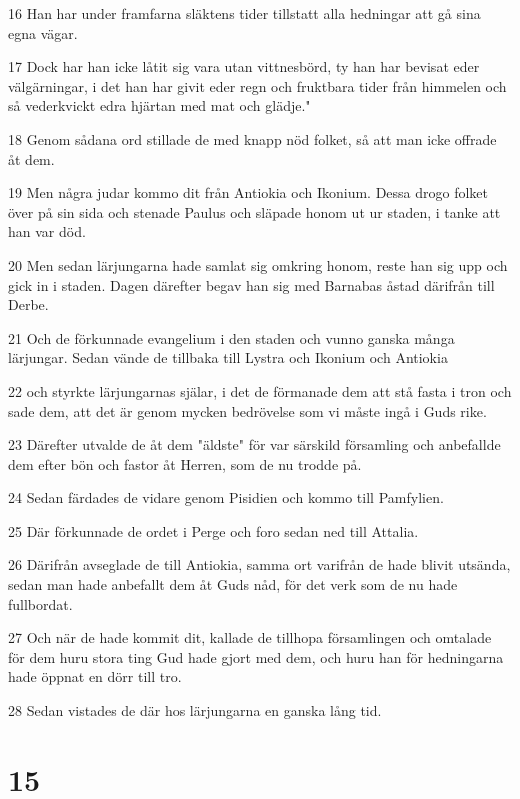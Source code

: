 \par 16 Han har under framfarna släktens tider tillstatt alla hedningar att gå sina egna vägar.
\par 17 Dock har han icke låtit sig vara utan vittnesbörd, ty han har bevisat eder välgärningar, i det han har givit eder regn och fruktbara tider från himmelen och så vederkvickt edra hjärtan med mat och glädje."
\par 18 Genom sådana ord stillade de med knapp nöd folket, så att man icke offrade åt dem.
\par 19 Men några judar kommo dit från Antiokia och Ikonium. Dessa drogo folket över på sin sida och stenade Paulus och släpade honom ut ur staden, i tanke att han var död.
\par 20 Men sedan lärjungarna hade samlat sig omkring honom, reste han sig upp och gick in i staden. Dagen därefter begav han sig med Barnabas åstad därifrån till Derbe.
\par 21 Och de förkunnade evangelium i den staden och vunno ganska många lärjungar. Sedan vände de tillbaka till Lystra och Ikonium och Antiokia
\par 22 och styrkte lärjungarnas själar, i det de förmanade dem att stå fasta i tron och sade dem, att det är genom mycken bedrövelse som vi måste ingå i Guds rike.
\par 23 Därefter utvalde de åt dem "äldste" för var särskild församling och anbefallde dem efter bön och fastor åt Herren, som de nu trodde på.
\par 24 Sedan färdades de vidare genom Pisidien och kommo till Pamfylien.
\par 25 Där förkunnade de ordet i Perge och foro sedan ned till Attalia.
\par 26 Därifrån avseglade de till Antiokia, samma ort varifrån de hade blivit utsända, sedan man hade anbefallt dem åt Guds nåd, för det verk som de nu hade fullbordat.
\par 27 Och när de hade kommit dit, kallade de tillhopa församlingen och omtalade för dem huru stora ting Gud hade gjort med dem, och huru han för hedningarna hade öppnat en dörr till tro.
\par 28 Sedan vistades de där hos lärjungarna en ganska lång tid.

\chapter{15}

